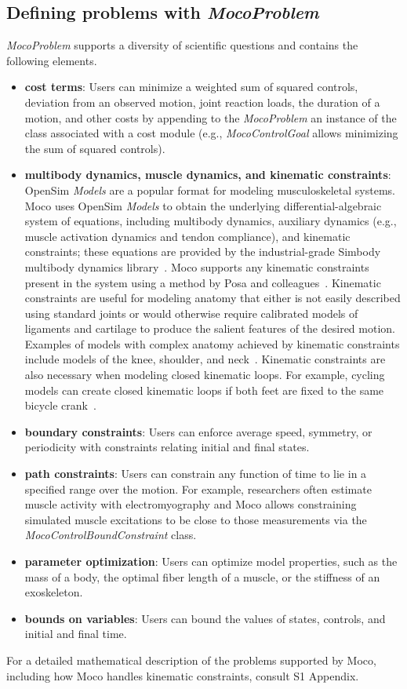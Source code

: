 \documentclass[10pt,letterpaper]{article}
\begin{document}
\subsection*{Defining problems with \textit{MocoProblem}}

\textit{MocoProblem} supports a diversity of scientific questions and contains the following elements.
\begin{itemize}
\item \textbf{cost terms}: Users can minimize a weighted sum of squared controls, deviation from an observed motion, joint reaction loads, the duration of a motion, and other costs by appending to the \textit{MocoProblem} an instance of the class associated with a cost module (e.g., \textit{MocoControlGoal} allows minimizing the sum of squared controls).
\item \textbf{multibody dynamics, muscle dynamics, and kinematic constraints}:\\OpenSim \textit{Models} are a popular format for modeling musculoskeletal systems. Moco uses OpenSim \textit{Models} to obtain the underlying differential-algebraic system of equations, including multibody dynamics, auxiliary dynamics (e.g., muscle activation dynamics and tendon compliance), and kinematic constraints; these equations are provided by the industrial-grade Simbody multibody dynamics library~\cite{Sherman:2011byc}. Moco supports any kinematic constraints present in the system using a method by Posa and colleagues~\cite{Posa:2016}. Kinematic constraints are useful for modeling anatomy that either is not easily described using standard joints or would otherwise require calibrated models of ligaments and cartilage to produce the salient features of the desired motion. Examples of models with complex anatomy achieved by kinematic constraints include models of the knee, shoulder, and neck~\cite{Seth:2016,Lerner:2015,Rajagopal:2016ek,Cazzola:2017}. Kinematic constraints are also necessary when modeling closed kinematic loops. For example, cycling models can create closed kinematic loops if both feet are fixed to the same bicycle crank~\cite{Jansen:2020}.
\item \textbf{boundary constraints}: Users can enforce average speed, symmetry, or periodicity with constraints relating initial and final states.
\item \textbf{path constraints}: Users can constrain any function of time to lie in a specified range over the motion. For example, researchers often estimate muscle activity with electromyography and Moco allows constraining simulated muscle excitations to be close to those measurements via the \textit{MocoControlBoundConstraint} class.
\item \textbf{parameter optimization}: Users can optimize model properties, such as the mass of a body, the optimal fiber length of a muscle, or the stiffness of an exoskeleton.
\item \textbf{bounds on variables}: Users can bound the values of states, controls, and initial and final time.
\end{itemize}
For a detailed mathematical description of the problems supported by Moco, including how Moco handles kinematic constraints, consult S1 Appendix.
\end{document}
